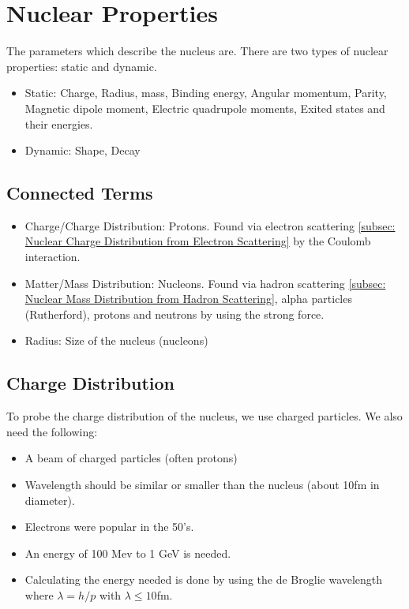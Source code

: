 \documentclass{article}
\begin{document}
\section{Nuclear Properties}
The parameters which describe the nucleus are. There are two types of nuclear properties: static and dynamic.
\begin{itemize}
    \item Static: Charge, Radius, mass, Binding energy, Angular momentum, Parity, Magnetic dipole moment, Electric quadrupole moments, Exited states and their energies. 
    \item Dynamic: Shape, Decay
\end{itemize}

\subsection{Connected Terms}
\begin{itemize}
    \item Charge/Charge Distribution: Protons. Found via electron scattering \cref{subsec: Nuclear Charge Distribution from Electron Scattering} by the Coulomb interaction. 
    \item Matter/Mass Distribution: Nucleons. Found via hadron scattering \cref{subsec: Nuclear Mass Distribution from Hadron Scattering}, alpha particles (Rutherford), protons and neutrons by using the strong force.
    \item Radius: Size of the nucleus (nucleons)
\end{itemize}

\subsection{Charge Distribution}
To probe the charge distribution of the nucleus, we use charged particles. We also need the following:
\begin{itemize}
    \item A beam of charged particles (often protons)
    \item Wavelength should be similar or smaller than the nucleus (about 10fm in diameter). 
    \item Electrons were popular in the 50's. 
    \item An energy of 100 Mev to 1 GeV is needed.
    \item Calculating the energy needed is done by using the de Broglie wavelength where $λ = h / p$ with $λ ≤ 10$fm. 
\end{itemize}
\end{document}
